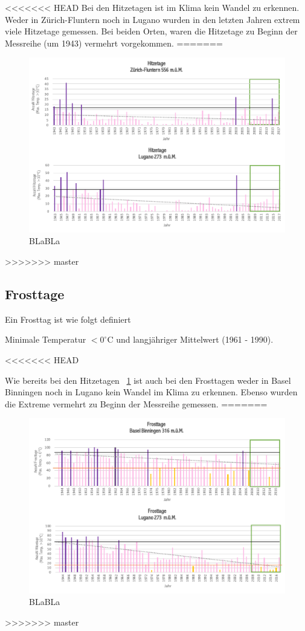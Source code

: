 \begin{refsection}
<<<<<<< HEAD
Bei den Hitzetagen ist im Klima kein Wandel zu erkennen. Weder in Zürich-Fluntern noch in Lugano wurden in den letzten Jahren extrem viele Hitzetage gemessen. Bei beiden Orten, waren die Hitzetage zu Beginn der Messreihe (um 1943) vermehrt vorgekommen.
=======
\begin{figure}[htbp]
\centering
\includegraphics[width=1.0\textwidth]{extrem/Hitzetage.pdf}
\caption{BLaBLa}
\label{Hitzetage}
\end{figure}
>>>>>>> master


\subsection{Frosttage}
Ein Frosttag ist wie folgt definiert

\begin{definition}
Minimale Temperatur $< 0^{\circ}$C und langjähriger Mittelwert (1961 - 1990).
\end{definition}

<<<<<<< HEAD

Wie bereits bei den Hitzetagen ~\ref{Hitzetage}  ist auch bei den Frosttagen weder in Basel Binningen noch in Lugano kein Wandel im Klima zu erkennen. Ebenso wurden die Extreme vermehrt zu Beginn der Messreihe gemessen.
=======
\begin{figure}[htbp]
\centering
\includegraphics[width=1.0\textwidth]{extrem/Frosttage.pdf}
\caption{BLaBLa}
\label{Frosttage}
\end{figure}
>>>>>>> master



\end{refsection}
